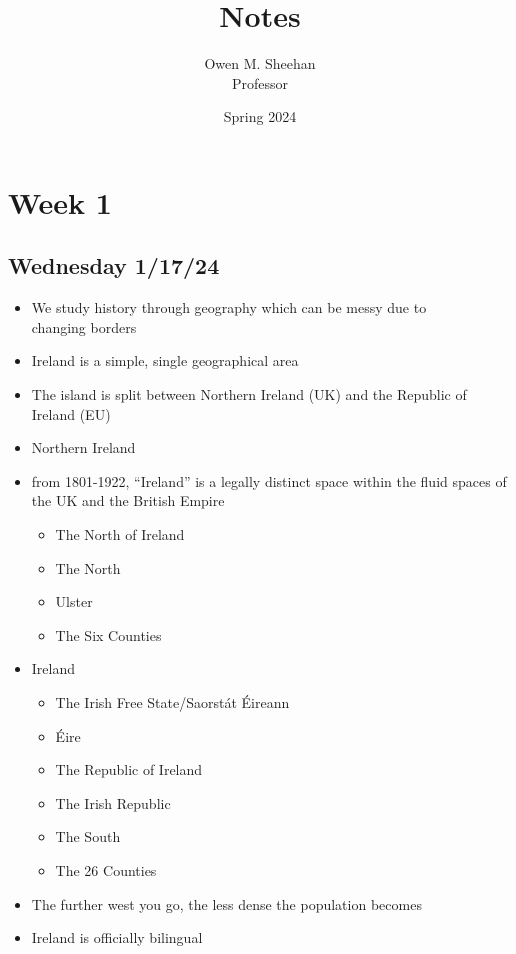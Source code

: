 \documentclass[12pt]{article}
\title{\class{} Notes}
\author{Owen M. Sheehan\\Professor \prof{}}
\date{Spring 2024}
\begin{document}
\maketitle
\tableofcontents
\newpage
    \section{Week 1}
        \subsection{Wednesday 1/17/24}
            \bigskip
            \begin{itemize}
                \item We study history through geography which can be messy due to \\changing borders
                \item Ireland is a simple, single geographical area
                \item The island is split between Northern Ireland (UK) and the Republic of Ireland (EU)
                \item Northern Ireland
                \item from 1801-1922, ``Ireland'' is a legally distinct space within the fluid spaces of the UK and the British Empire
                \begin{itemize}
                    \item The North of Ireland
                    \item The North
                    \item Ulster
                    \item The Six Counties
                \end{itemize}
                \item Ireland
                \begin{itemize}
                    \item The Irish Free State/Saorstát Éireann
                    \item Éire
                    \item The Republic of Ireland
                    \item The Irish Republic
                    \item The South
                    \item The 26 Counties
                \end{itemize}
                \item The further west you go, the less dense the population becomes
                \item Ireland is officially bilingual


\end{itemize}
\end{document}

